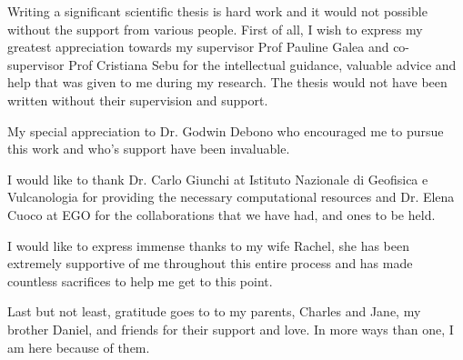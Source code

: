 \begin{acknowledgements}
Writing a significant scientific thesis is hard work and it would not possible without the support from various people. First of all, I wish to express my greatest appreciation towards my supervisor Prof Pauline Galea and co-supervisor Prof Cristiana Sebu for the intellectual guidance, valuable advice and help that was given to me during my research. The thesis would not have been written without their supervision and support.

My special appreciation to Dr. Godwin Debono who encouraged me to pursue this work and who's support have been invaluable.

I would like to thank Dr. Carlo Giunchi at Istituto Nazionale di Geofisica e Vulcanologia for providing the necessary computational resources and Dr. Elena Cuoco at EGO for the collaborations that we have had, and ones to be held.

I would like to express immense thanks to my wife Rachel, she has been extremely supportive of me throughout this entire process and has made countless sacrifices to help me get to this point. 

Last but not least, gratitude goes to to my parents, Charles and Jane, my brother Daniel, and friends for their support and love. In more ways than one, I am here because of them.
\end{acknowledgements}